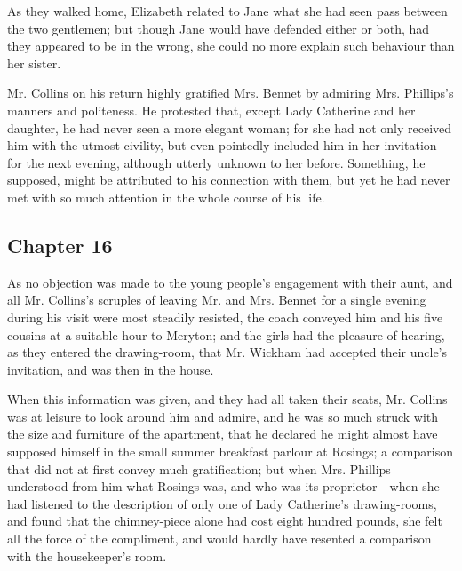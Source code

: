 As they walked home, Elizabeth related to Jane what she had seen pass between the two gentlemen; but though Jane would have defended either or both, had they appeared to be in the wrong, she could no more explain such behaviour than her sister.

Mr. Collins on his return highly gratified Mrs. Bennet by admiring Mrs. Phillips's manners and politeness. He protested that, except Lady Catherine and her daughter, he had never seen a more elegant woman; for she had not only received him with the utmost civility, but even pointedly included him in her invitation for the next evening, although utterly unknown to her before. Something, he supposed, might be attributed to his connection with them, but yet he had never met with so much attention in the whole course of his life.

\subsection[chapter-16]{\useURL[url16][][][]\from[url16] Chapter 16}

As no objection was made to the young people's engagement with their aunt, and all Mr. Collins's scruples of leaving Mr. and Mrs. Bennet for a single evening during his visit were most steadily resisted, the coach conveyed him and his five cousins at a suitable hour to Meryton; and the girls had the pleasure of hearing, as they entered the drawing-room, that Mr. Wickham had accepted their uncle's invitation, and was then in the house.

When this information was given, and they had all taken their seats, Mr. Collins was at leisure to look around him and admire, and he was so much struck with the size and furniture of the apartment, that he declared he might almost have supposed himself in the small summer breakfast parlour at Rosings; a comparison that did not at first convey much gratification; but when Mrs. Phillips understood from him what Rosings was, and who was its proprietor---when she had listened to the description of only one of Lady Catherine's drawing-rooms, and found that the chimney-piece alone had cost eight hundred pounds, she felt all the force of the compliment, and would hardly have resented a comparison with the housekeeper's room.


